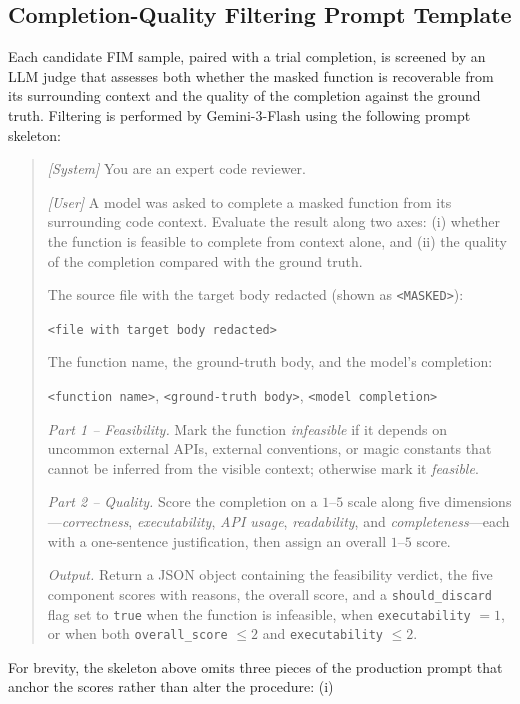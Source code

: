 \subsection{Completion-Quality Filtering Prompt Template}
\label{app:algo:filter}
Each candidate FIM sample, paired with a trial completion, is screened
by an LLM judge that assesses both whether the masked function is
recoverable from its surrounding context and the quality of the
completion against the ground truth. Filtering is performed by
Gemini-3-Flash using the following prompt skeleton:
\begin{quote}\small
\textit{[System]} You are an expert code reviewer.

\noindent\textit{[User]} A model was asked to complete a masked
function from its surrounding code context. Evaluate the result along
two axes: (i) whether the function is feasible to complete from
context alone, and (ii) the quality of the completion compared with
the ground truth.

\noindent The source file with the target body redacted (shown as
\texttt{<MASKED>}):

\noindent\texttt{<file with target body redacted>}

\noindent The function name, the ground-truth body, and the model's
completion:

\noindent\texttt{<function name>}, \texttt{<ground-truth body>},
\texttt{<model completion>}

\noindent\textit{Part 1 -- Feasibility.} Mark the function
\emph{infeasible} if it depends on uncommon external APIs, external
conventions, or magic constants that cannot be inferred from the
visible context; otherwise mark it \emph{feasible}.

\noindent\textit{Part 2 -- Quality.} Score the completion on a
$1$--$5$ scale along five dimensions---\emph{correctness},
\emph{executability}, \emph{API usage}, \emph{readability}, and
\emph{completeness}---each with a one-sentence justification, then
assign an overall $1$--$5$ score.

\noindent\textit{Output.} Return a JSON object containing the
feasibility verdict, the five component scores with reasons, the
overall score, and a \texttt{should\_discard} flag set to
\texttt{true} when the function is infeasible, when
\texttt{executability} $= 1$, or when both \texttt{overall\_score}
$\le 2$ and \texttt{executability} $\le 2$.
\end{quote}
For brevity, the skeleton above omits three pieces of the production
prompt that anchor the scores rather than alter the procedure: (i)
